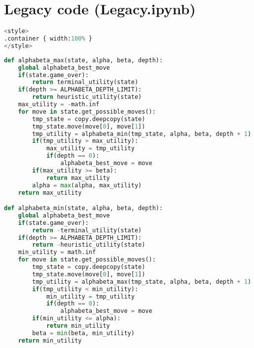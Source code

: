 \hypertarget{legacy-code-legacy.ipynb}{%
\section{Legacy code (Legacy.ipynb)}\label{legacy-code-legacy.ipynb}}

\begin{lstlisting}[language=Python]
%%HTML
<style>
.container { width:100% }
</style>
\end{lstlisting}

\begin{lstlisting}[language=Python]
def alphabeta_max(state, alpha, beta, depth):
    global alphabeta_best_move
    if(state.game_over):
        return terminal_utility(state)
    if(depth >= ALPHABETA_DEPTH_LIMIT):
        return heuristic_utility(state)
    max_utility = -math.inf
    for move in state.get_possible_moves():
        tmp_state = copy.deepcopy(state)
        tmp_state.move(move[0], move[1])
        tmp_utility = alphabeta_min(tmp_state, alpha, beta, depth + 1)
        if(tmp_utility > max_utility):
            max_utility = tmp_utility
            if(depth == 0):
                alphabeta_best_move = move
        if(max_utility >= beta):
            return max_utility
        alpha = max(alpha, max_utility)
    return max_utility

def alphabeta_min(state, alpha, beta, depth):
    global alphabeta_best_move
    if(state.game_over):
        return -terminal_utility(state)
    if(depth >= ALPHABETA_DEPTH_LIMIT):
        return -heuristic_utility(state)
    min_utility = math.inf
    for move in state.get_possible_moves():
        tmp_state = copy.deepcopy(state)
        tmp_state.move(move[0], move[1])
        tmp_utility = alphabeta_max(tmp_state, alpha, beta, depth + 1)
        if(tmp_utility < min_utility):
            min_utility = tmp_utility
            if(depth == 0):
                alphabeta_best_move = move
        if(min_utility <= alpha):
            return min_utility
        beta = min(beta, min_utility)
    return min_utility
\end{lstlisting}

